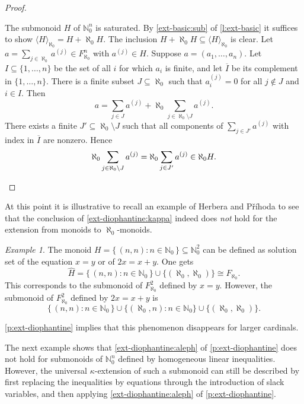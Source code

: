 \documentclass[a4paper,11pt,oneside]{amsart}
\theoremstyle{remark}
\newtheorem{example}[teor]{Example}
\newcommand{\bN}{\mathbb N}
\begin{document}
\begin{proof}
\begin{proofenumerate}
\item[\ref{ext-diophantine:aleph}]
  The submonoid $H$ of $\bN_0^n$ is saturated.
  By \ref{ext-basic:sub} of \cref{l:ext-basic} it suffices to show $\langle H \rangle_{\aleph_0} = H + \aleph_0H$.
  The inclusion $H +\aleph_0 H \subseteq \langle H \rangle_{\aleph_0}$ is clear.
  Let $a = \sum_{j \in \aleph_0} a^{(j)} \in F_{\aleph_0}^n$ with $a^{(j)} \in H$.
  Suppose $a=(a_1,\ldots,a_n)$.
  Let $I \subseteq \{1,\ldots,n\}$ be the set of all $i$ for which $a_i$ is finite, and let $\overline{I}$ be its complement in $\{1,\ldots,n\}$.
  There is a finite subset $J \subseteq \aleph_0$ such that $a^{(j)}_i = 0$ for all $j \not\in J$ and $i \in I$.
  Then
  \[
    a = \sum_{j \in J} a^{(j)}  + \aleph_0 \sum_{j \in \aleph_0 \setminus J} a^{(j)}.
  \]
  There exists a finite $J' \subseteq \aleph_0 \setminus J$ such that all components of $\sum_{j \in J'} a^{(j)}$ with index in $\overline{I}$ are nonzero.
  Hence
  \[
    \aleph_0 \sum_{j \in \aleph_0 \setminus J} a^{(j)} = \aleph_0 \sum_{j \in J'} a^{(j)} \in \aleph_0 H. \qedhere
  \]
  \end{proofenumerate}
\end{proof}

At this point it is illustrative to recall an example of Herbera and Příhoda \cite[Example 2.8]{PavelHerbera} to see that the conclusion of \ref{ext-diophantine:kappa} indeed does \emph{not} hold for the extension from monoids to $\aleph_0$-monoids.

\begin{example}  \label{exm:eqn-aleph0}
  The monoid $H = \{\, (n,n) : n \in \bN_0 \,\} \subseteq \bN_0^2$ can be defined as solution set of the equation $x=y$ or of $2x=x+y$.
  One gets
  \[
    \widehat H = \{\, (n,n) : n \in \bN_0 \,\} \cup \{(\aleph_0,\aleph_0)\} \cong F_{\aleph_0}.
  \]
  This corresponds to the submonoid of $F_{\aleph_0}^2$ defined by $x=y$.
  However, the submonoid of $F_{\aleph_0}^2$ defined by $2x=x+y$ is
  \[
    \{\, (n,n) : n \in \bN_0 \,\} \cup \{(\aleph_0,n) :n \in \bN_0 \} \cup \{ (\aleph_0,\aleph_0) \}.
  \]
\end{example}

\cref{p:ext-diophantine} implies that this phenomenon disappears for larger cardinals.

The next example shows that \ref{ext-diophantine:aleph} of \cref{p:ext-diophantine} does not hold for submonoids of $\bN_0^n$ defined by homogeneous linear inequalities.
However, the universal $\kappa$-extension of such a submonoid can still be described by first replacing the inequalities by equations through the introduction of slack variables, and then applying \ref{ext-diophantine:aleph} of \cref{p:ext-diophantine}.
\end{document}
